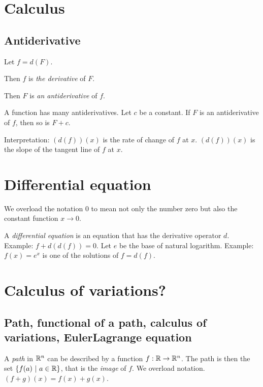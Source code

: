 \section{Calculus}

\subsection{Antiderivative}

Let \( f = d(F) \).

Then \( f \) is \emph{the derivative} of \( F \).

%
Then \( F \) is \emph{an antiderivative} of \(f\).

A function has many antiderivatives.
Let \(c\) be a constant.
If \(F\) is an antiderivative of \(f\), then so is \(F + c\).

Interpretation:
\( (d(f))(x) \) is the rate of change of \(f\) at \(x\).
\( (d(f))(x) \) is the slope of the tangent line of \(f\) at \(x\).

\section{Differential equation}
\label{sec:diff-eqn}

We overload the notation 0 to mean not only the number zero but also the constant function \( x \to 0 \).

%
A \emph{differential equation} is an equation that has the derivative operator \(d\).
Example: \( f + d(d(f)) = 0 \).
Let \(e\) be the base of natural logarithm.
Example: \( f(x) = e^x \) is one of the solutions of \( f = d(f) \).

\section{Calculus of variations?}

\subsection{Path, functional of a path, calculus of variations, Euler\textendash{}Lagrange equation}

%
A \emph{path} in \( \mathbb{R}^n \) can be described by a function \( f : \mathbb{R} \to \mathbb{R}^n \).
The path is then the set \( \{ f(a) ~|~ a \in \mathbb{R} \} \), that is the \emph{image} of \(f\).
We overload notation.
\( (f+g)(x) = f(x) + g(x) \).


